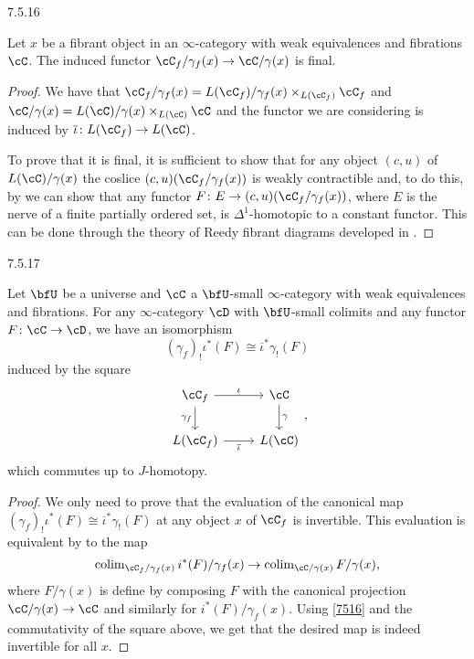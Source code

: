 \documentclass[a4paper,12pt]{scrartcl}
\begin{document}
\begin{prop}\label{7516}
  7.5.16

  Let $x$ be a fibrant object in an $\infty$-category with weak equivalences and
  fibrations $\cC$. The induced functor
  $\cC_f/\gamma_f(x)\rightarrow\cC/\gamma(x)$ is final.
\end{prop}
\begin{proof}
  We have that $\cC_f/\gamma_f(x)=L(\cC_f)/\gamma_f(x)\times_{L(\cC_f)}\cC_f$
  and $\cC/\gamma(x)=L(\cC)/\gamma(x)\times_{L(\cC)}\cC$ and the functor we are
  considering is induced by $\overline{\iota}\colon L(\cC_f)\rightarrow L(\cC)$.
  
  To prove that it is final, it is sufficient to show that for any object
  $(c,u)$ of $L(\cC)/\gamma(x)$ the coslice $(c,u)\\(\cC_f/\gamma_f(x))$ is
  weakly contractible and, to do this, by \cite[Lem.\ 4.3.15]{Cis19} we can show
  that any functor $F\colon E\rightarrow (c,u)\\(\cC_f/\gamma_f(x))$, where $E$
  is the nerve of a finite partially ordered set, is $\Delta^1$-homotopic to a
  constant functor. This can be done through the theory of Reedy fibrant
  diagrams developed in \cite[Ch.\ 7.4]{Cis19}.
\end{proof}

\begin{prop}\label{7517}
  7.5.17

  Let $\bfU$ be a universe and $\cC$ a $\bfU$-small $\infty$-category with weak
  equivalences and fibrations. For any $\infty$-category $\cD$ with $\bfU$-small
  colimits and any functor $F\colon\cC\rightarrow\cD$, we have an isomorphism
  \[(\gamma_f)_!\iota^*(F)\cong\overline{\iota}^*\gamma_!(F)\]
  induced by the square
  \[\begin{tikzcd}
    {\cC_f} & \cC \\
    {L(\cC_f)} & {L(\cC)}
    \arrow["\gamma", from=1-2, to=2-2]
    \arrow["{\gamma_f}"', from=1-1, to=2-1]
    \arrow["\iota", from=1-1, to=1-2]
    \arrow["{\overline{\iota}}"', from=2-1, to=2-2]
  \end{tikzcd},\]
  which commutes up to $J$-homotopy.
\end{prop}
\begin{proof}
  We only need to prove that the evaluation of the canonical map
  $(\gamma_f)_!\iota^*(F)\cong\overline{\iota}^*\gamma_!(F)$ at any object $x$
  of $\cC_f$ is invertible. This evaluation is equivalent by \cite[Prop.\
  6.4.9]{Cis19} to the map
  \[\colim_{\cC_f/\gamma_f(x)}i^*(F)/\gamma_f(x)\rightarrow\colim_{\cC/\gamma(x)}F/\gamma(x),\]
  where $F/\gamma(x)$ is define by composing $F$ with the canonical projection
  $\cC/\gamma(x)\rightarrow\cC$ and similarly for $i^*(F)/\gamma_f(x)$. Using
  \ref{7516} and the commutativity of the square above, we get that the desired
  map is indeed invertible for all $x$.
\end{proof}
\end{document}
